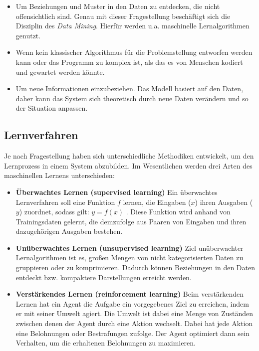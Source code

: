\begin{itemize}
	\item Um Beziehungen und Muster in den Daten zu entdecken, die nicht offensichtlich sind. Genau mit dieser Fragestellung beschäftigt sich die Disziplin des \textit{Data Mining}. Hierfür werden u.a. maschinelle Lernalgorithmen genutzt.
	\item Wenn kein klassischer Algorithmus für die Problemstellung entworfen werden kann oder das Programm zu komplex ist, als das es von Menschen kodiert und gewartet werden könnte.
	\item Um neue Informationen einzubeziehen. Das Modell basiert auf den Daten, daher kann das System sich theoretisch durch neue Daten verändern und so der Situation anpassen.
\end{itemize}

\subsection{Lernverfahren}

Je nach Fragestellung haben sich unterschiedliche Methodiken entwickelt, um den Lernprozess in einem System abzubilden. Im Wesentlichen werden drei Arten des maschinellen Lernens unterschieden:

\begin{itemize}
	\item \textbf{Überwachtes Lernen (supervised learning)} Ein überwachtes Lernverfahren soll eine Funktion $f$ lernen, die Eingaben ($x$) ihren Ausgaben ($y$) zuordnet, sodass gilt: $y = f(x)$ . Diese Funktion wird anhand von Trainingsdaten gelernt, die demzufolge aus Paaren von Eingaben und ihren dazugehörigen Ausgaben bestehen.
	\item \textbf{Unüberwachtes Lernen (unsupervised learning)} Ziel unüberwachter Lernalgorithmen ist es, großen Mengen von nicht kategorisierten Daten zu gruppieren oder zu komprimieren. Dadurch können Beziehungen in den Daten entdeckt bzw. kompaktere Darstellungen erreicht werden.
	\item \textbf{Verstärkendes Lernen (reinforcement learning)} Beim verstärkenden Lernen hat ein Agent die Aufgabe ein vorgegebenes Ziel zu erreichen, indem er mit seiner Umwelt agiert. Die Umwelt ist dabei eine Menge von Zuständen zwischen denen der Agent durch eine Aktion wechselt. Dabei hat jede Aktion eine Belohnungen oder Bestrafungen zufolge. Der Agent optimiert dann sein Verhalten, um die erhaltenen Belohnungen zu maximieren.
\end{itemize}

